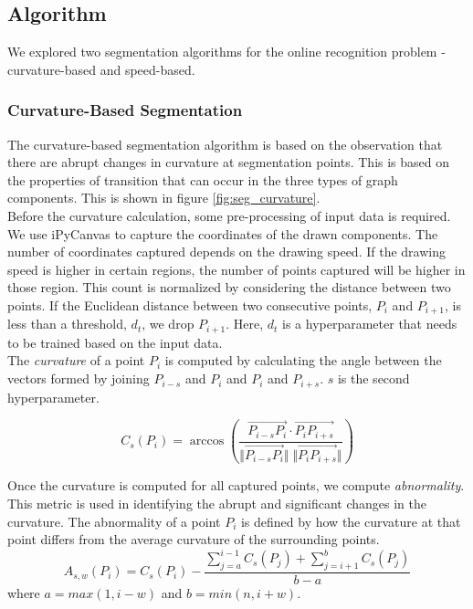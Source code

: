 \subsection{Algorithm}
We explored two segmentation algorithms for the online recognition problem - curvature-based and speed-based.

\subsubsection{Curvature-Based Segmentation}
The curvature-based segmentation algorithm is based on the observation that there are abrupt changes in curvature at segmentation points. This is based on the properties of transition that can occur in the three types of graph components. This is shown in figure \ref{fig:seg_curvature}.\\

Before the curvature calculation, some pre-processing of input data is required. We use iPyCanvas \cite{ipycanvas} to capture the coordinates of the drawn components. The number of coordinates captured depends on the drawing speed. If the drawing speed is higher in certain regions, the number of points captured will be higher in those region. This count is normalized by considering the distance between two points. If the Euclidean distance between two consecutive points, $P_i$ and $P_{i+1}$, is less than a threshold, $d_t$, we drop $P_{i+1}$. Here, $d_t$ is a hyperparameter that needs to be trained based on the input data.\\

The \textit{curvature} of a point $P_i$ is computed by calculating the angle between the vectors formed by joining $P_{i-s}$ and $P_i$ and $P_i$ and $P_{i+s}$. $s$ is the second hyperparameter.

\begin{equation}
	C_s(P_i) = \arccos \left(  \frac{\overrightarrow{P_{i-s} P_i} \cdot \overrightarrow{P_i P_{i+s}}}{ \Vert \overrightarrow{P_{i-s} P_i}  \Vert \; \Vert \overrightarrow{P_i P_{i+s}} \Vert  } \right) 
\end{equation} 

Once the curvature is computed for all captured points, we compute \textit{abnormality}. This metric is used in identifying the abrupt and significant changes in the curvature. The abnormality of a point $P_i$ is defined by how the curvature at that point differs from the average curvature of the surrounding points.
\begin{equation}
	A_{s,w}(P_i) = C_s(P_i) - \frac{\sum_{j=a}^{i-1} C_s(P_j) + \sum_{j=i+1}^{b} C_s(P_j)}{b - a}
\end{equation}
where $a = max(1, i-w)$ and $b = min(n, i+w)$.\\

